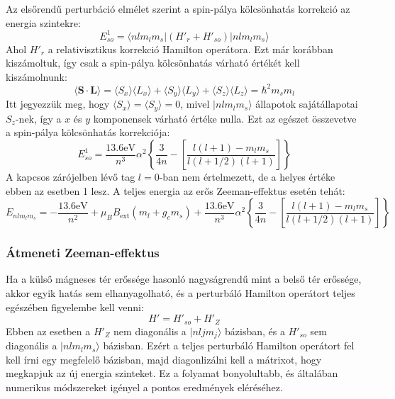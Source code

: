 \documentclass[../main.tex]{subfiles}
\begin{document}
Az elsőrendű perturbáció elmélet szerint a spin-pálya kölcsönhatás korrekció az energia szintekre:
\begin{equation}
    E^1_{so} = \langle n l m_l m_s | (H'_r + H'_{so}) | n l m_l m_s \rangle
\end{equation}
Ahol $H'_r$ a relativisztikus korrekció Hamilton operátora. Ezt már korábban kiszámoltuk, így csak a spin-pálya kölcsönhatás várható értékét kell kiszámolnunk:
\begin{equation}
    \langle \mathbf{S} \cdot \mathbf{L} \rangle = \langle S_x \rangle \langle L_x \rangle + \langle S_y \rangle \langle L_y \rangle + \langle S_z \rangle \langle L_z \rangle = \hbar^2 m_s m_l
\end{equation}
Itt jegyezzük meg, hogy $\langle S_x \rangle = \langle S_y \rangle = 0$, mivel $|n l m_l m_s \rangle$ állapotok sajátállapotai $S_z$-nek, így a $x$ és $y$ komponensek várható értéke nulla.
Ezt az egészet összevetve a spin-pálya kölcsönhatás korrekciója:
\begin{equation}
    E^1_{so} = \frac{13.6 \text{eV}}{n^3} \alpha^2 \left\{\frac{3}{4n} - \left[\frac{l(l + 1) - m_l m_s }{l (l + 1/2)(l + 1)}\right]\right\}
\end{equation}
A kapcsos zárójelben lévő tag $l = 0$-ban nem értelmezett, de a helyes értéke ebben az esetben 1 lesz. A teljes energia az erős Zeeman-effektus esetén tehát:
\begin{equation}
    E_{n l m_l m_s} = - \frac{13.6 \text{eV}}{n^2} + \mu_B B_{\text{ext}} (m_l + g_e m_s) + \frac{13.6 \text{eV}}{n^3} \alpha^2 \left\{\frac{3}{4n} - \left[\frac{l(l + 1) - m_l m_s }{l (l + 1/2)(l + 1)}\right]\right\}
\end{equation}

\subsubsection*{Átmeneti Zeeman-effektus}
Ha a külső mágneses tér erőssége hasonló nagyságrendű mint a belső tér erőssége, akkor egyik hatás sem elhanyagolható, és a perturbáló Hamilton operátort teljes egészében figyelembe kell venni:
\begin{equation}
    H' = H'_{so} + H'_{Z}
\end{equation}
Ebben az esetben a $H'_{Z}$ nem diagonális a $|n l j m_j \rangle$ bázisban, és a $H'_{so}$ sem diagonális a $|n l m_l m_s \rangle$ bázisban. Ezért a teljes perturbáló Hamilton operátort fel kell írni egy megfelelő bázisban,
majd diagonlizálni kell a mátrixot, hogy megkapjuk az új energia szinteket. Ez a folyamat bonyolultabb, és általában numerikus módszereket igényel a pontos eredmények eléréséhez.
\end{document}
